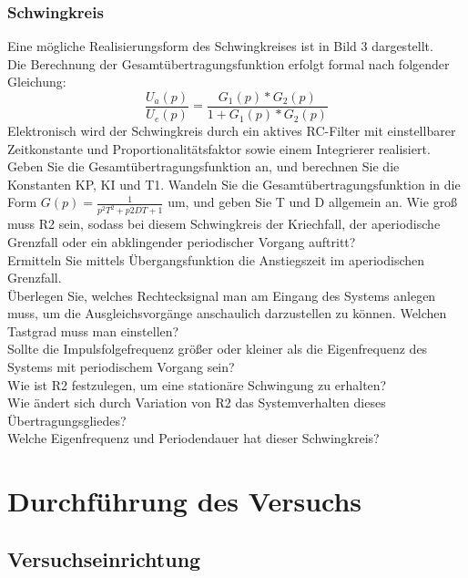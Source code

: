 \subsubsection{Schwingkreis}
Eine mögliche Realisierungsform des Schwingkreises ist in Bild 3 dargestellt.\\

Die Berechnung der Gesamtübertragungsfunktion erfolgt formal nach folgender Gleichung: \\
\begin{equation}
	\frac{ U_{ a }(p) }{ U_{ e }(p) } =\frac{ G_{ 1 }(p)*G_{ 2 }(p) }{ 1+G_{ 1 }(p)*G_{ 2 }(p)  }
\end{equation}
Elektronisch wird der Schwingkreis durch ein aktives RC-Filter mit einstellbarer Zeitkonstante
und Proportionalitätsfaktor sowie einem Integrierer realisiert.\\
Geben Sie die Gesamtübertragungsfunktion an, und berechnen Sie die Konstanten KP, KI und T1. 
Wandeln Sie die Gesamtübertragungsfunktion in die Form $G(p)=\frac{ 1 }{ p^{ 2 }T^{ 2 }+p2DT+1  }$ um, und geben Sie T und D allgemein an. 
Wie groß muss R2 sein, sodass bei diesem Schwingkreis der Kriechfall, der aperiodische Grenzfall oder ein 
abklingender periodischer Vorgang auftritt?\\
Ermitteln Sie mittels Übergangsfunktion die Anstiegszeit im 
aperiodischen Grenzfall. \\
Überlegen Sie, welches Rechtecksignal man am Eingang des Systems anlegen muss, um die 
Ausgleichsvorgänge anschaulich darzustellen zu können. Welchen Tastgrad muss man einstellen?\\
Sollte die Impulsfolgefrequenz größer oder kleiner als die Eigenfrequenz des Systems mit periodischem Vorgang sein?\\
Wie ist R2 festzulegen, um eine stationäre Schwingung zu erhalten?\\
Wie ändert sich durch Variation von R2 das Systemverhalten dieses Übertragungsgliedes?\\
Welche Eigenfrequenz und Periodendauer hat dieser Schwingkreis?\\

\section{Durchführung des Versuchs}
\subsection{Versuchseinrichtung}

